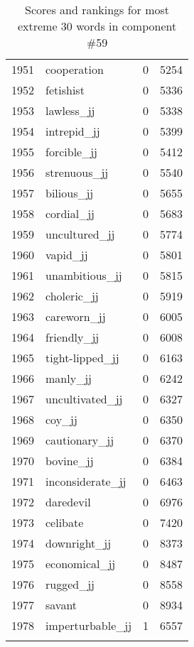 \begin{longtable}[!htbp]{| rlr@{.}l |}
    1951 & cooperation & 0 & 5254 \\
    1952 & fetishist & 0 & 5336 \\
    1953 & lawless\_jj & 0 & 5338 \\
    1954 & intrepid\_jj & 0 & 5399 \\
    1955 & forcible\_jj & 0 & 5412 \\
    1956 & strenuous\_jj & 0 & 5540 \\
    1957 & bilious\_jj & 0 & 5655 \\
    1958 & cordial\_jj & 0 & 5683 \\
    1959 & uncultured\_jj & 0 & 5774 \\
    1960 & vapid\_jj & 0 & 5801 \\
    1961 & unambitious\_jj & 0 & 5815 \\
    1962 & choleric\_jj & 0 & 5919 \\
    1963 & careworn\_jj & 0 & 6005 \\
    1964 & friendly\_jj & 0 & 6008 \\
    1965 & tight-lipped\_jj & 0 & 6163 \\
    1966 & manly\_jj & 0 & 6242 \\
    1967 & uncultivated\_jj & 0 & 6327 \\
    1968 & coy\_jj & 0 & 6350 \\
    1969 & cautionary\_jj & 0 & 6370 \\
    1970 & bovine\_jj & 0 & 6384 \\
    1971 & inconsiderate\_jj & 0 & 6463 \\
    1972 & daredevil & 0 & 6976 \\
    1973 & celibate & 0 & 7420 \\
    1974 & downright\_jj & 0 & 8373 \\
    1975 & economical\_jj & 0 & 8487 \\
    1976 & rugged\_jj & 0 & 8558 \\
    1977 & savant & 0 & 8934 \\
    1978 & imperturbable\_jj & 1 & 6557 \\
    \hline
    \caption{Scores and rankings for most extreme 30 words in component \#59} \\
\end{longtable}
